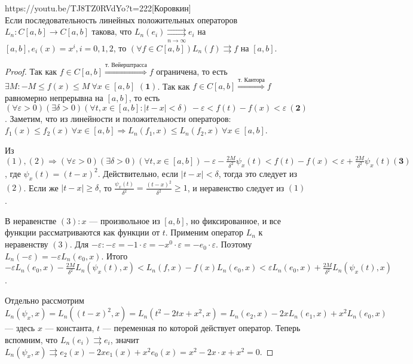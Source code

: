 \begin{linkthm}{https://youtu.be/TJ8TZ0RVdYo?t=222}[Коровкин]\ \\
	Если последовательность линейных положительных операторов $L_n:C[a,b]\to C[a,b]$ такова, что $L_n(e_i)\underset{n\to\infty}{\rightrightarrows} e_i$ на $[a,b], e_i(x)=x^i, i=0,1,2$, то $(\forall f\in C[a,b]) L_n(f)\rightrightarrows f$ на $[a,b]$.
\end{linkthm}
\begin{proof}
Так как $f\in C[a,b]\overset{\text{т. Вейерштрасса}}{\Rightarrow} f$ ограничена, то есть $\exists M: {-M\leqslant f(x)\leqslant M}\ \forall x\in [a,b]$ $\boldsymbol{(1)}$. Так как $f\in C[a,b]\overset{\text{т. Кантора}}{\Rightarrow} f$ равномерно непрерывна на $[a,b]$, то есть $(\forall\varepsilon>0)(\exists\delta>0)(\forall t,x\in[a,b]: |t-x|<\delta)\ -\varepsilon<f(t)-f(x)<\varepsilon\ \boldsymbol{(2)}$.
Заметим, что из линейности и положительности операторов: $f_1(x)\leqslant f_2(x)\ \forall x\in[a,b]\Rightarrow {L_n(f_1,x)\leqslant L_n(f_2,x)\ \forall x\in [a,b]}$. 

Из $(1), (2) \Rightarrow (\forall\varepsilon>0)(\exists\delta>0)(\forall t, x\in[a,b]) -\varepsilon-\frac{2M}{\delta^2}\psi_x(t)<f(t)-f(x)<\varepsilon+\frac{2M}{\delta^2}\psi_x(t) \boldsymbol{(3)}$, где $\psi_x(t)=(t-x)^2$. Действительно, если $|t-x|<\delta$, тогда это следует из $(2)$. Если же $|t-x|\geqslant\delta$, то $\frac{\psi_x(t)}{\delta^2}=\frac{(t-x)^2}{\delta^2}\geqslant 1$, и неравенство следует из $(1)$.

В неравенстве $(3): x$ --- произвольное из $[a,b]$, но фиксированное, и все функции рассматриваются как функции от $t$. Применим оператор $L_n$ к неравенству $(3)$. Для $-\varepsilon: -\varepsilon = -1\cdot\varepsilon = -x^0\cdot\varepsilon = -e_0\cdot\varepsilon$. Поэтому $L_n(-\varepsilon) = -\varepsilon L_n(e_0,x)$. Итого \\$-\varepsilon L_n(e_0,x)-\frac{2M}{\delta^2}L_n(\psi_x(t),x)<L_n(f,x)-f(x)L_n(e_0,x)<\varepsilon L_n(e_0,x)+\frac{2M}{\delta^2}L_n(\psi_x(t),x)$.

Отдельно рассмотрим $L_n(\psi_x,x)=L_n((t-x)^2,x)=L_n(t^2-2tx+x^2,x)={L_n(e_2,x)-2xL_n(e_1,x)+x^2L_n(e_0,x)}$ --- здесь $x$ --- константа, $t$ --- переменная по которой действует оператор. Теперь вспомним, что $L_n(e_i)\rightrightarrows e_i$, значит $L_n(\psi_x,x)\rightrightarrows e_2(x)-2xe_1(x)+x^2e_0(x) = x^2-2x\cdot x+x^2=0$.


\end{proof}
